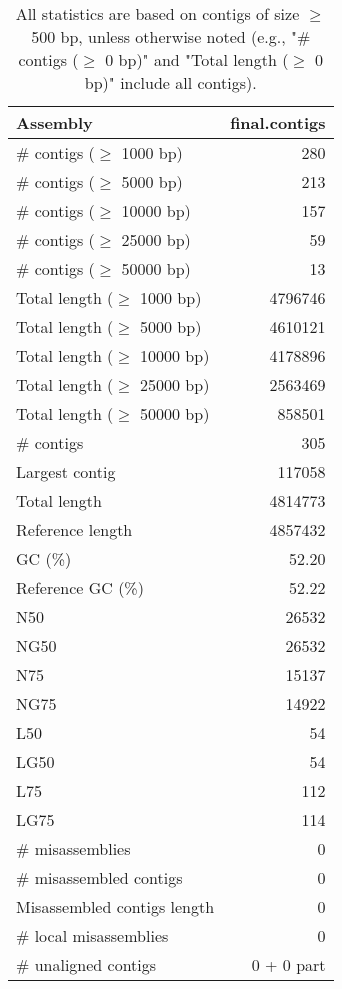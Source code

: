 \documentclass[12pt,a4paper]{article}
\begin{document}
\begin{table}[ht]
\begin{center}
\caption{All statistics are based on contigs of size $\geq$ 500 bp, unless otherwise noted (e.g., "\# contigs ($\geq$ 0 bp)" and "Total length ($\geq$ 0 bp)" include all contigs).}
\begin{tabular}{|l*{1}{|r}|}
\hline
Assembly & final.contigs \\ \hline
\# contigs ($\geq$ 1000 bp) & 280 \\ \hline
\# contigs ($\geq$ 5000 bp) & 213 \\ \hline
\# contigs ($\geq$ 10000 bp) & 157 \\ \hline
\# contigs ($\geq$ 25000 bp) & 59 \\ \hline
\# contigs ($\geq$ 50000 bp) & 13 \\ \hline
Total length ($\geq$ 1000 bp) & 4796746 \\ \hline
Total length ($\geq$ 5000 bp) & 4610121 \\ \hline
Total length ($\geq$ 10000 bp) & 4178896 \\ \hline
Total length ($\geq$ 25000 bp) & 2563469 \\ \hline
Total length ($\geq$ 50000 bp) & 858501 \\ \hline
\# contigs & 305 \\ \hline
Largest contig & 117058 \\ \hline
Total length & 4814773 \\ \hline
Reference length & 4857432 \\ \hline
GC (\%) & 52.20 \\ \hline
Reference GC (\%) & 52.22 \\ \hline
N50 & 26532 \\ \hline
NG50 & 26532 \\ \hline
N75 & 15137 \\ \hline
NG75 & 14922 \\ \hline
L50 & 54 \\ \hline
LG50 & 54 \\ \hline
L75 & 112 \\ \hline
LG75 & 114 \\ \hline
\# misassemblies & 0 \\ \hline
\# misassembled contigs & 0 \\ \hline
Misassembled contigs length & 0 \\ \hline
\# local misassemblies & 0 \\ \hline
\# unaligned contigs & 0 + 0 part \\ \hline

\end{tabular}
\end{center}
\end{table}
\end{document}
